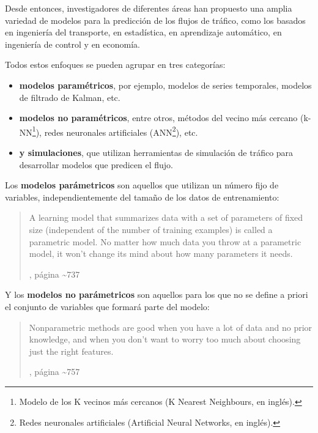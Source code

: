 \documentclass[]{book}
\providecommand{\tightlist}{%
  \setlength{\itemsep}{0pt}\setlength{\parskip}{0pt}}
\let\rmarkdownfootnote\footnote%
\def\footnote{\protect\rmarkdownfootnote}
\begin{document}
Desde entonces, investigadores de diferentes áreas han propuesto una
amplia variedad de modelos para la predicción de los flujos de tráfico,
como los basados en ingeniería del transporte, en estadística, en
aprendizaje automático, en ingeniería de control y en economía.

Todos estos enfoques se pueden agrupar en tres categorías:

\begin{itemize}
\tightlist
\item
  \textbf{modelos paramétricos}, por ejemplo, modelos de series
  temporales, modelos de filtrado de Kalman, etc.
\item
  \textbf{modelos no paramétricos}, entre otros, métodos del vecino más
  cercano (k-NN\footnote{Modelo de los K vecinos más cercanos (K Nearest
    Neighbours, en inglés).}), redes neuronales artificiales
  (ANN\footnote{Redes neuronales artificiales (Artificial Neural
    Networks, en inglés).  
     }), etc.
\item
  \textbf{y simulaciones}, que utilizan herramientas de simulación de
  tráfico para desarrollar modelos que predicen el flujo.
\end{itemize}

Los \textbf{modelos parámetricos} son aquellos que utilizan un número
fijo de variables, independientemente del tamaño de los datos de
entrenamiento:

\begin{quote}
A learning model that summarizes data with a set of parameters of fixed
size (independent of the number of training examples) is called a
parametric model. No matter how much data you throw at a parametric
model, it won't change its mind about how many parameters it needs.

\citep{russell2016artificial}, página \textasciitilde{}737
\end{quote}

Y los \textbf{modelos no parámetricos} son aquellos para los que no se
define a priori el conjunto de variables que formará parte del modelo:

\begin{quote}
Nonparametric methods are good when you have a lot of data and no prior
knowledge, and when you don't want to worry too much about choosing just
the right features.

\citep{russell2016artificial}, página \textasciitilde{}757
\end{quote}
\end{document}

